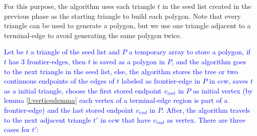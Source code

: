 \documentclass[pdflatex,sn-mathphys]{sn-jnl}%
\theoremstyle{thmstyleone}%
\theoremstyle{thmstyletwo}%
\theoremstyle{thmstylethree}%
\begin{document}
For this purpose, the algorithm  uses each triangle $t$ in the seed list created in the previous phase as the starting triangle to build each polygon. Note that every triangle can be used to generate a polygon, but we use one triangle adjacent to a terminal-edge to avoid generating the same polygon twice. 

\textcolor{blue}{Let be $t$ a triangle of the seed list and $P$ a temporary array to store a polygon, if $t$ has 3 frontier-edges, then $t$ is saved as a polygon in $P$, and the algorithm goes to the next triangle in the seed list, else, the algorithm stores the tree or two continuous endpoints of the edges of $t$ labeled as frontier-edge in $P$ in ccw, saves $t$ as a initial triangle, choose the first stored endpoint $v_{init}$ in $P$ as initial vertex (by lemma \ref{l:verticeslemma} each vertex of a terminal-edge region is part of a frontier-edge) and the last stored endpoint $v_{end}$ in $P$. After, the algorithm travels to the next adjacent triangle $t'$ in ccw that have $v_{end}$ as vertex. There are three cases for $t'$:}




\end{document}
